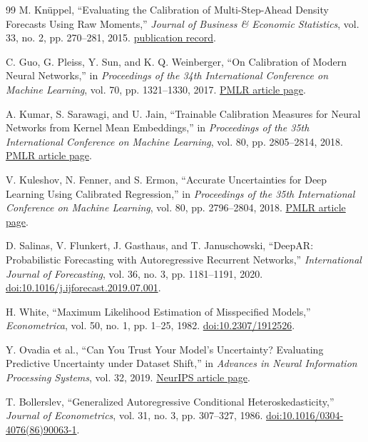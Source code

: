\documentclass[11pt]{article}
\begin{document}
\begin{thebibliography}{99}
M. Kn\"uppel,
``Evaluating the Calibration of Multi-Step-Ahead Density Forecasts Using Raw
Moments,'' \emph{Journal of Business \& Economic Statistics}, vol. 33,
no. 2, pp. 270--281, 2015.
\href{https://ideas.repec.org/a/taf/jnlbes/v33y2015i2p270-281.html}{publication record}.

C. Guo, G. Pleiss, Y. Sun, and K. Q. Weinberger,
``On Calibration of Modern Neural Networks,'' in
\emph{Proceedings of the 34th International Conference on Machine Learning},
vol. 70, pp. 1321--1330, 2017.
\href{https://proceedings.mlr.press/v70/guo17a.html}{PMLR article page}.

A. Kumar, S. Sarawagi, and U. Jain,
``Trainable Calibration Measures for Neural Networks from Kernel Mean
Embeddings,'' in \emph{Proceedings of the 35th International Conference on
Machine Learning}, vol. 80, pp. 2805--2814, 2018.
\href{https://proceedings.mlr.press/v80/kumar18a.html}{PMLR article page}.

V. Kuleshov, N. Fenner, and S. Ermon,
``Accurate Uncertainties for Deep Learning Using Calibrated Regression,'' in
\emph{Proceedings of the 35th International Conference on Machine Learning},
vol. 80, pp. 2796--2804, 2018.
\href{https://proceedings.mlr.press/v80/kuleshov18a.html}{PMLR article page}.

D. Salinas, V. Flunkert, J. Gasthaus, and T. Januschowski,
``DeepAR: Probabilistic Forecasting with Autoregressive Recurrent Networks,''
\emph{International Journal of Forecasting}, vol. 36, no. 3,
pp. 1181--1191, 2020.
\href{https://doi.org/10.1016/j.ijforecast.2019.07.001}{doi:10.1016/j.ijforecast.2019.07.001}.

H. White,
``Maximum Likelihood Estimation of Misspecified Models,''
\emph{Econometrica}, vol. 50, no. 1, pp. 1--25, 1982.
\href{https://doi.org/10.2307/1912526}{doi:10.2307/1912526}.

Y. Ovadia et al.,
``Can You Trust Your Model's Uncertainty? Evaluating Predictive Uncertainty
under Dataset Shift,'' in \emph{Advances in Neural Information Processing
Systems}, vol. 32, 2019.
\href{https://proceedings.neurips.cc/paper_files/paper/2019/hash/8558cb408c1d76621371888657d2eb1d-Abstract.html}{NeurIPS article page}.

T. Bollerslev,
``Generalized Autoregressive Conditional Heteroskedasticity,''
\emph{Journal of Econometrics}, vol. 31, no. 3, pp. 307--327, 1986.
\href{https://doi.org/10.1016/0304-4076(86)90063-1}{doi:10.1016/0304-4076(86)90063-1}.

\end{thebibliography}
\end{document}
